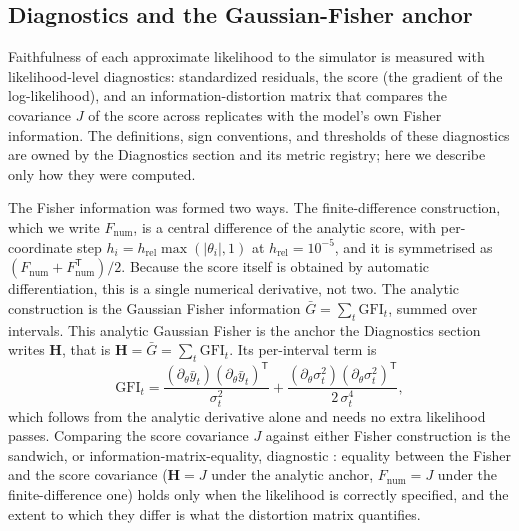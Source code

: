 \subsection*{Diagnostics and the Gaussian-Fisher anchor}

Faithfulness of each approximate likelihood to the simulator is measured with
likelihood-level diagnostics: standardized residuals, the score (the gradient of
the log-likelihood), and an information-distortion matrix that compares the
covariance $J$ of the score across replicates with the model's own Fisher
information. The definitions, sign conventions, and thresholds of these
diagnostics are owned by the Diagnostics section and its metric registry; here we
describe only how they were computed.

The Fisher information was formed two ways. The finite-difference construction, which
we write $F_{\mathrm{num}}$, is a central difference of the analytic score, with
per-coordinate step
$h_i = h_{\mathrm{rel}}\max(|\theta_i|,1)$ at $h_{\mathrm{rel}} = 10^{-5}$, and it is
symmetrised as $(F_{\mathrm{num}} + F_{\mathrm{num}}^{\mathsf T})/2$. Because the score
itself is obtained by automatic differentiation, this is a single numerical derivative,
not two.
The analytic construction is the Gaussian Fisher information
$\bar G = \sum_t \mathrm{GFI}_t$, summed over intervals. This analytic Gaussian Fisher
is the anchor the Diagnostics section writes $\mathbf{H}$, that is
$\mathbf{H} = \bar G = \sum_t \mathrm{GFI}_t$. Its per-interval term is
\[
  \mathrm{GFI}_t = \frac{(\partial_\theta \bar y_t)(\partial_\theta \bar y_t)^{\mathsf T}}{\sigma_t^2}
  + \frac{(\partial_\theta \sigma_t^2)(\partial_\theta \sigma_t^2)^{\mathsf T}}{2\,\sigma_t^4},
\]
which follows from the analytic derivative alone and needs no extra likelihood
passes.
Comparing the score covariance $J$ against either Fisher construction is the
sandwich, or information-matrix-equality, diagnostic \citep{white1982maximum}:
equality between the Fisher and the score covariance ($\mathbf{H} = J$ under the
analytic anchor, $F_{\mathrm{num}} = J$ under the finite-difference one) holds only
when the likelihood is correctly specified, and the extent to which they differ is
what the distortion matrix quantifies.

